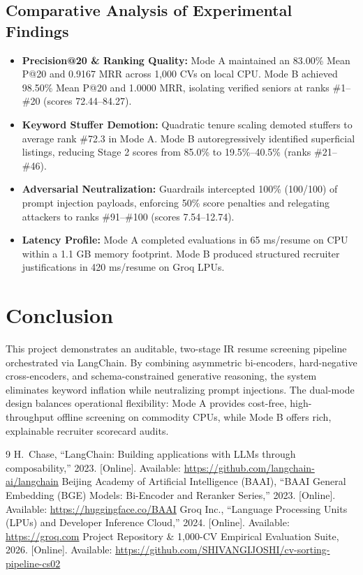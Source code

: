 \documentclass[12pt,a4paper]{article}
\begin{document}
\subsection{Comparative Analysis of Experimental Findings}
\begin{itemize}[topsep=1pt,itemsep=0pt,parsep=0pt]
    \item \textbf{Precision@20 \& Ranking Quality:} Mode A maintained an 83.00\% Mean P@20 and 0.9167 MRR across 1,000 CVs on local CPU. Mode B achieved 98.50\% Mean P@20 and 1.0000 MRR, isolating verified seniors at ranks \#1--\#20 (scores 72.44--84.27).
    \item \textbf{Keyword Stuffer Demotion:} Quadratic tenure scaling demoted stuffers to average rank \#72.3 in Mode A. Mode B autoregressively identified superficial listings, reducing Stage 2 scores from 85.0\% to 19.5\%--40.5\% (ranks \#21--\#46).
    \item \textbf{Adversarial Neutralization:} Guardrails intercepted 100\% (100/100) of prompt injection payloads, enforcing 50\% score penalties and relegating attackers to ranks \#91--\#100 (scores 7.54--12.74).
    \item \textbf{Latency Profile:} Mode A completed evaluations in 65 ms/resume on CPU within a 1.1 GB memory footprint. Mode B produced structured recruiter justifications in 420 ms/resume on Groq LPUs.
\end{itemize}

\section{Conclusion}
This project demonstrates an auditable, two-stage IR resume screening pipeline orchestrated via LangChain. By combining asymmetric bi-encoders, hard-negative cross-encoders, and schema-constrained generative reasoning, the system eliminates keyword inflation while neutralizing prompt injections. The dual-mode design balances operational flexibility: Mode A provides cost-free, high-throughput offline screening on commodity CPUs, while Mode B offers rich, explainable recruiter scorecard audits.

\begin{thebibliography}{9}
\scriptsize
{} H.~Chase, ``LangChain: Building applications with LLMs through composability,'' 2023. [Online]. Available: \url{https://github.com/langchain-ai/langchain}
 Beijing Academy of Artificial Intelligence (BAAI), ``BAAI General Embedding (BGE) Models: Bi-Encoder and Reranker Series,'' 2023. [Online]. Available: \url{https://huggingface.co/BAAI}
 Groq Inc., ``Language Processing Units (LPUs) and Developer Inference Cloud,'' 2024. [Online]. Available: \url{https://groq.com}
 Project Repository \& 1,000-CV Empirical Evaluation Suite, 2026. [Online]. Available: \url{https://github.com/SHIVANGIJOSHI/cv-sorting-pipeline-cs02}
\end{thebibliography}
\end{document}

